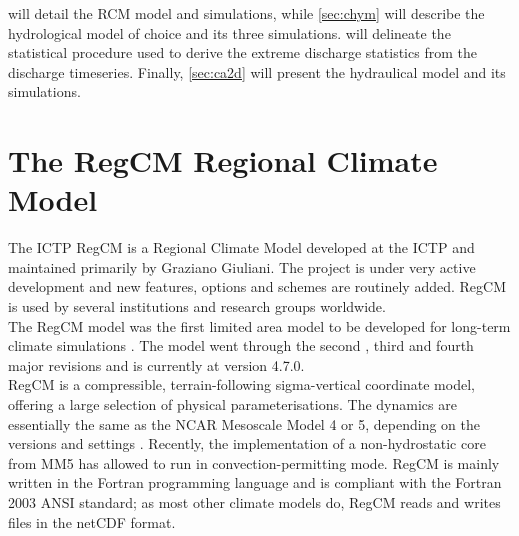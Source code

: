  will detail the RCM model and simulations, while \cref{sec:chym} will describe the hydrological model of choice and its three simulations.
 will delineate the statistical procedure used to derive the extreme discharge statistics from the discharge timeseries. Finally, \cref{sec:ca2d} will present the hydraulical model and its simulations.



\section{The RegCM Regional Climate Model} \label{sec:regcm}
The ICTP RegCM is a Regional Climate Model developed at the ICTP and maintained primarily by Graziano Giuliani. The project is under very active development and new features, options and schemes are routinely added. RegCM is used by several institutions and research groups worldwide.\\
The RegCM model was the first limited area model to be developed for long-term climate simulations \citep{dickinson1989regional, Giorgi1989}. The model went through the second \citep{Giorgi1993}, third \citep{Pal2007} and fourth \citep{giorgi2012RegmoddespretesovemulCORdom} major revisions and is currently at version 4.7.0.\\
RegCM is a compressible, terrain-following sigma-vertical coordinate model, offering a large selection of physical parameterisations. The dynamics are essentially the same as the NCAR Mesoscale Model 4 or 5, depending on the versions and settings \citep[MM4, MM5,][]{Grell1994}.
Recently, the implementation of a non-hydrostatic core from MM5 has allowed to run in convection-permitting mode.
RegCM is mainly written in the Fortran programming language and is compliant with the Fortran 2003 ANSI standard; as most other climate models do, RegCM reads and writes files in the netCDF format.

